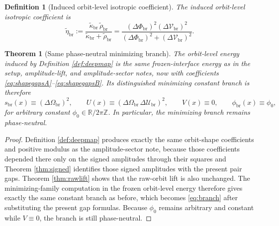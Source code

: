 \documentclass[11pt]{article}
\newcommand{\RespShapeCov}{\widetilde\kappa_{\mathrm{br}}}
\newcommand{\RespShapeRelax}{\widetilde\rho_{\mathrm{br}}}
\newcommand{\RespShapeIso}{\widetilde\eta_{\mathrm{br}}}
\newcommand{\RespVacPhase}{\phi_{\mathrm{br}}}
\newcommand{\ScaleMod}{s_{\mathrm{br}}}
\newcommand{\GapCov}{\Delta \Phi_{\mathrm{br}}}
\newcommand{\GapRelax}{\Delta \mathcal V_{\mathrm{br}}}
\newcommand{\GapEq}{\Delta \mathcal U_{\mathrm{br}}}
\newcommand{\GapScale}{\Delta \Omega_{\mathrm{br}}}
\newtheorem{definition}{Definition}
\newtheorem{theorem}{Theorem}
\begin{document}
\begin{definition}[Induced orbit-level isotropic coefficient]
\label{def:isocoeff}
The induced orbit-level isotropic coefficient is
\begin{equation}
\RespShapeIso
:=
\frac{\RespShapeCov\,\RespShapeRelax}{\RespShapeCov+\RespShapeRelax}
=
\frac{(\GapCov)^{2}(\GapRelax)^{2}}{(\GapCov)^{2}+(\GapRelax)^{2}}.
\label{eq:iso}
\end{equation}
\end{definition}

\begin{theorem}[Same phase-neutral minimizing branch]
\label{thm:branch}
The orbit-level energy induced by Definition \ref{def:deepmap} is the same frozen-interface energy as in the setup, amplitude-lift, and amplitude-sector notes, now with coefficients \eqref{eq:shapegapsA}--\eqref{eq:shapegapsB}. Its distinguished minimizing constant branch is therefore
\begin{equation}
\ScaleMod(x)\equiv(\GapScale)^{2},
\qquad
U(x)\equiv(\GapScale\,\GapEq)^{2},
\qquad
V(x)\equiv0,
\qquad
\RespVacPhase(x)\equiv\phi_{0},
\label{eq:branch}
\end{equation}
for arbitrary constant \(\phi_{0}\in\mathbb R/2\pi\mathbb Z\). In particular, the minimizing branch remains phase-neutral.
\end{theorem}

\begin{proof}
Definition \ref{def:deepmap} produces exactly the same orbit-shape coefficients and positive modulus as the amplitude-sector note, because those coefficients depended there only on the signed amplitudes through their squares and Theorem \ref{thm:signed} identifies those signed amplitudes with the present pair gaps. Theorem \ref{thm:rawlift} shows that the raw-orbit lift is also unchanged. The minimizing-family computation in the frozen orbit-level energy therefore gives exactly the same constant branch as before, which becomes \eqref{eq:branch} after substituting the present gap formulas. Because \(\phi_{0}\) remains arbitrary and constant while \(V\equiv0\), the branch is still phase-neutral.
\end{proof}
\end{document}
